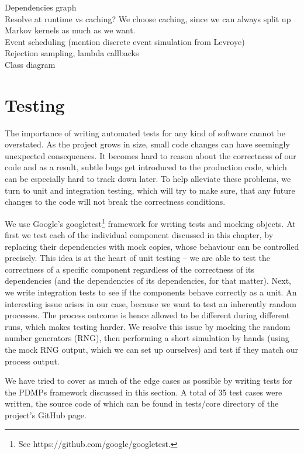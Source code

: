 \documentclass[report.tex]{subfiles}
\begin{document}
Dependencies graph\\
Resolve at runtime vs caching? We choose caching, since we can always split up Markov kernels as much as we want.\\
Event scheduling (mention discrete event simulation from Levroye)\\
Rejection sampling, lambda callbacks\\
Class diagram

\section{Testing}

The importance of writing automated tests for any kind of software cannot be overstated.
As the project grows in size, small code changes can have seemingly unexpected consequences.
It becomes hard to reason about the correctness of our code and as a result,
subtle bugs get introduced to the production code, which can be especially hard to
track down later. To help alleviate these problems, we turn to unit and integration testing,
which will try to make sure, that any future changes to the code will not break the
correctness conditions.

We use Google's googletest\footnote{
See https://github.com/google/googletest.}
framework for writing tests and mocking objects.
At first we test each of the individual component discussed in this chapter, by
replacing their dependencies with mock copies, whose behaviour can be controlled precisely.
This idea is at the heart of unit testing -- we are able to test the correctness of a
specific component regardless of the correctness of its dependencies
(and the dependencies of its dependencies, for that matter).
Next, we write integration tests to see if the components behave correctly as a unit.
An interesting issue arises in our case, because we want to test an inherently random
processes. The process outcome is hence allowed to be different during different
runs, which makes testing harder.
We resolve this issue by mocking the random number generators (RNG), then performing
a short simulation by hands (using the mock RNG output, which we can set up ourselves)
and test if they match our process output.

We have tried to cover as much of the edge cases as possible by writing tests
for the PDMPs framework discussed in this section. A total of 35 test cases were
written, the source code of which can be found in tests/core directory of the
project's GitHub page.
\end{document}
